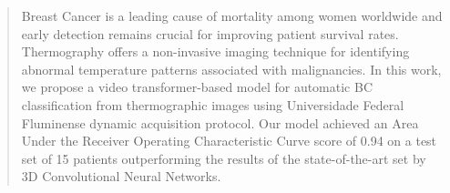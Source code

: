 \documentclass[runningheads]{llncs}
\begin{document}
%
\maketitle              %
%
\begin{abstract}
  Breast Cancer is a leading cause of mortality among women
  worldwide and early detection remains crucial for improving patient
  survival rates. Thermography offers a non-invasive imaging
  technique for identifying abnormal temperature patterns associated
  with malignancies. In this work, we propose a video
  transformer-based model for automatic BC classification from
  thermographic images using Universidade Federal Fluminense
  dynamic acquisition protocol. Our model achieved an Area Under the
  Receiver Operating Characteristic Curve score of 0.94 on a
  test set of 15 patients outperforming the results of the
  state-of-the-art set by 3D Convolutional Neural Networks.

\end{abstract}
\end{document}
